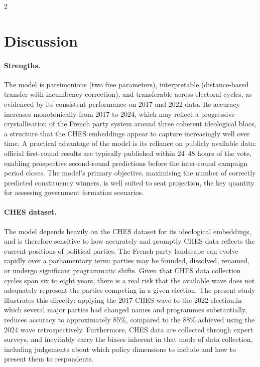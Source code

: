 \documentclass[10pt, a4paper]{article}
\begin{document}
\begin{multicols}{2}
\section{Discussion}
\label{sec:discussion}

\paragraph{Strengths.}
The model is parsimonious (two free parameters), interpretable
(distance-based transfer with incumbency correction), and transferable across
electoral cycles, as evidenced by its consistent performance on 2017 and 2022
data. Its accuracy increases monotonically from 2017 to 2024, which may
reflect a progressive crystallisation of the French party system around three
coherent ideological blocs, a structure that the CHES embeddings appear to
capture increasingly well over time. A practical advantage of the model is
its reliance on publicly available data: official first-round results are
typically published within 24--48 hours of the vote, enabling prospective
second-round predictions before the inter-round campaign period closes. The
model's primary objective, maximising the number of correctly predicted
constituency winners, is well suited to seat projection, the key quantity
for assessing government formation scenarios.

\paragraph{CHES dataset.}
The model depends heavily on the CHES dataset for its ideological embeddings,
and is therefore sensitive to how accurately and promptly CHES data reflects
the current positions of political parties. The French party landscape can
evolve rapidly over a parliamentary term: parties may be founded, dissolved,
renamed, or undergo significant programmatic shifts. Given that CHES data
collection cycles span six to eight years, there is a real risk that the
available wave does not adequately represent the parties competing in a given
election. The present study illustrates this directly: applying the 2017 CHES
wave to the 2022 election,in which several major parties had changed names
and programmes substantially, reduces accuracy to approximately 85\%,
compared to the 88\% achieved using the 2024 wave retrospectively. Furthermore,
CHES data are collected through expert surveys, and inevitably carry the biases
inherent in that mode of data collection, including judgements about which
policy dimensions to include and how to present them to respondents.


\end{multicols}
\end{document}
